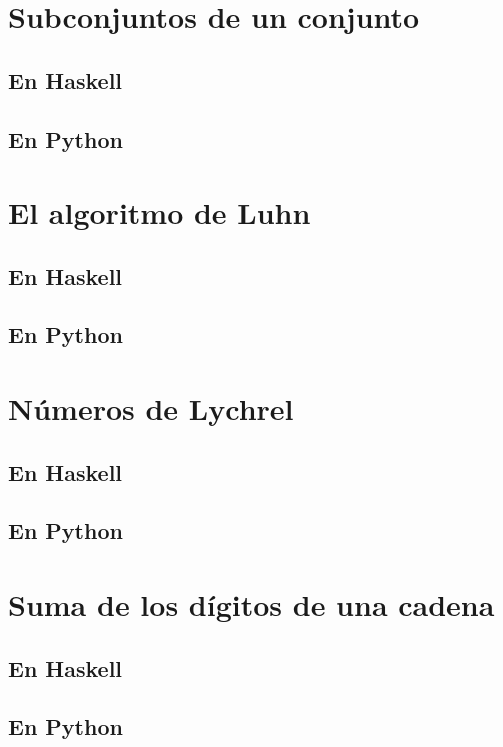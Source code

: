 \documentclass[a4paper,12pt,twoside]{book}
\begin{document}
\section{Subconjuntos de un conjunto}
\subsection*{En Haskell}
\subsection*{En Python}

\section{El algoritmo de Luhn}
\subsection*{En Haskell}
\subsection*{En Python}

\section{Números de Lychrel}
\subsection*{En Haskell}
\subsection*{En Python}

\section{Suma de los dígitos de una cadena}
\subsection*{En Haskell}
\subsection*{En Python}
\end{document}
